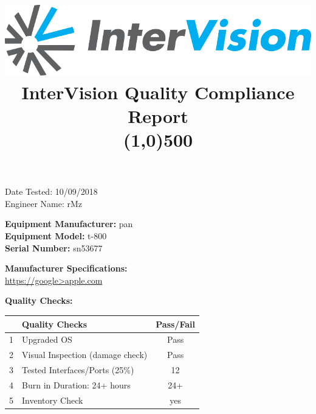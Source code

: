 \documentclass[12pt]{article}
\author{}
\title{\includegraphics[scale=1]{IV_logo.png}
\\InterVision Quality Compliance Report\\\line(1,0){500}\vspace{-8ex}}
\date{}
\begin{document}
\maketitle
\begin{flushright}
Date Tested: 10/09/2018\\
Engineer Name: rMz\\
\end{flushright}
\begin{flushleft}
\textbf{Equipment Manufacturer: } pan\\
\textbf{Equipment Model: } t-800\\
\textbf{Serial Number: } sn53677\\
\end{flushleft}
\begin{flushleft}
\textbf{Manufacturer Specifications:} \\\url{https://google>apple.com} \\
\end{flushleft}
\begin{flushleft}
\textbf{Quality Checks:} 
\end{flushleft}
\begin{table}[H]
\centering
\begin{tabular}{|c|l|c|}
 \hline
& \textbf{Quality Checks}  & \textbf{Pass/Fail} \\ \hline
1& Upgraded OS & Pass \\ \hline
2& Visual Inspection (damage check) & Pass \\ \hline
3& Tested Interfaces/Ports (25\%) & 12 \\ \hline
4& Burn in Duration: 24+ hours & 24+ \\ \hline
5& Inventory Check & yes \\ \hline
\end{tabular}
\end{table}
\end{document}
